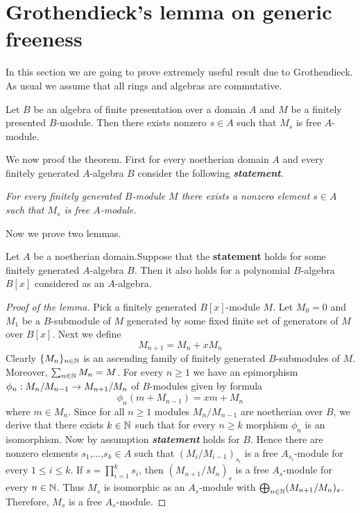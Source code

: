 \section{Grothendieck's lemma on generic freeness}

In this section we are going to prove extremely useful result due to Grothendieck. As usual we assume that all rings and algebras are commutative.

\begin{theorem}\label{theorem:genericfreeness}
Let $B$ be an algebra of finite presentation over a domain $A$ and $M$ be a finitely presented $B$-module. Then there exists nonzero $s\in A$ such that $M_s$ is free $A$-module.
\end{theorem}
\noindent
We now proof the theorem. First for every noetherian domain $A$ and every finitely generated $A$-algebra $B$ consider the following \textit{\textbf{statement}}.
\begin{center}
\textit{For every finitely generated $B$-module $M$ there exists a nonzero element $s\in A$ such that $M_s$ is free $A$-module.}
\end{center}
Now we prove two lemmas.

\begin{lemma}\label{lemma:genericfreenessfirstlemma}
Let $A$ be a noetherian domain.Suppose that the \textbf{statement} holds for some finitely generated $A$-algebra $B$. Then it also holds for a polynomial $B$-algebra $B[x]$ considered as an $A$-algebra.
\end{lemma}
\begin{proof}[Proof of the lemma]
Pick a finitely generated $B[x]$-module $M$. Let $M_0=0$ and $M_1$ be a $B$-submodule of $M$ generated by some fixed finite set of generators of $M$ over $B[x]$. Next we define
$$M_{n+1}=M_n+xM_n$$
Clearly $\{M_n\}_{n\in {\mathbb N}}$ is an ascending family of finitely generated $B$-submodules of $M$. Moreover, $\sum_{n\in {\mathbb N}}M_n=M$. For every $n\geq 1$ we have an epimorphism $\phi_n:M_n/M_{n-1}\rightarrow M_{n+1}/M_n$ of $B$-modules given by formula
$$\phi_n(m+M_{n-1})=xm+M_n$$
where $m\in M_n$. Since for all $n\geq 1$ modules $M_n/M_{n-1}$ are noetherian over $B$, we derive that there exists $k\in {\mathbb N}$ such that  for every $n\geq k$ morphism $\phi_n$ is an isomorphism. Now by assumption \textit{\textbf{statement}} holds for $B$. Hence there are nonzero elements $s_1$,...,$s_k\in A$ such that $(M_i/M_{i-1})_{s_i}$ is a free $A_{s_i}$-module for every $1\leq i\leq k$. If $s=\prod^k_{i=1}s_i$, then $(M_{n+1}/M_{n})_s$ is a free $A_s$-module for every $n\in {\mathbb N}$. Thus $M_s$ is isomorphic as an $A_s$-module with $\bigoplus_{n\in {\mathbb N}}(M_{n+1}/M_n)_s$. Therefore, $M_s$ is a free $A_s$-module.
\end{proof}

